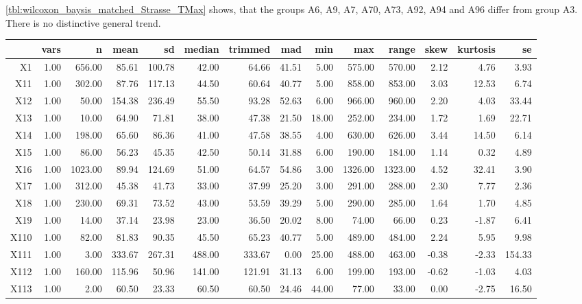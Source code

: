 \cref{tbl:wilcoxon_baysis_matched_Strasse_TMax} shows, that the groups A6, A9, A7, A70, A73, A92, A94 and A96 differ from group A3. There is no distinctive general trend.
\begin{table}[ht!]
	\tiny
	\centering
  \begin{tabular}{rrrrrrrrrrrrrr}
    \hline
   & vars & n & mean & sd & median & trimmed & mad & min & max & range & skew & kurtosis & se \\ 
    \hline
  X1 & 1.00 & 656.00 & 85.61 & 100.78 & 42.00 & 64.66 & 41.51 & 5.00 & 575.00 & 570.00 & 2.12 & 4.76 & 3.93 \\ 
    X11 & 1.00 & 302.00 & 87.76 & 117.13 & 44.50 & 60.64 & 40.77 & 5.00 & 858.00 & 853.00 & 3.03 & 12.53 & 6.74 \\ 
    X12 & 1.00 & 50.00 & 154.38 & 236.49 & 55.50 & 93.28 & 52.63 & 6.00 & 966.00 & 960.00 & 2.20 & 4.03 & 33.44 \\ 
    X13 & 1.00 & 10.00 & 64.90 & 71.81 & 38.00 & 47.38 & 21.50 & 18.00 & 252.00 & 234.00 & 1.72 & 1.69 & 22.71 \\ 
    X14 & 1.00 & 198.00 & 65.60 & 86.36 & 41.00 & 47.58 & 38.55 & 4.00 & 630.00 & 626.00 & 3.44 & 14.50 & 6.14 \\ 
    X15 & 1.00 & 86.00 & 56.23 & 45.35 & 42.50 & 50.14 & 31.88 & 6.00 & 190.00 & 184.00 & 1.14 & 0.32 & 4.89 \\ 
    X16 & 1.00 & 1023.00 & 89.94 & 124.69 & 51.00 & 64.57 & 54.86 & 3.00 & 1326.00 & 1323.00 & 4.52 & 32.41 & 3.90 \\ 
    X17 & 1.00 & 312.00 & 45.38 & 41.73 & 33.00 & 37.99 & 25.20 & 3.00 & 291.00 & 288.00 & 2.30 & 7.77 & 2.36 \\ 
    X18 & 1.00 & 230.00 & 69.31 & 73.52 & 43.00 & 53.59 & 39.29 & 5.00 & 290.00 & 285.00 & 1.64 & 1.70 & 4.85 \\ 
    X19 & 1.00 & 14.00 & 37.14 & 23.98 & 23.00 & 36.50 & 20.02 & 8.00 & 74.00 & 66.00 & 0.23 & -1.87 & 6.41 \\ 
    X110 & 1.00 & 82.00 & 81.83 & 90.35 & 45.50 & 65.23 & 40.77 & 5.00 & 489.00 & 484.00 & 2.24 & 5.95 & 9.98 \\ 
    X111 & 1.00 & 3.00 & 333.67 & 267.31 & 488.00 & 333.67 & 0.00 & 25.00 & 488.00 & 463.00 & -0.38 & -2.33 & 154.33 \\ 
    X112 & 1.00 & 160.00 & 115.96 & 50.96 & 141.00 & 121.91 & 31.13 & 6.00 & 199.00 & 193.00 & -0.62 & -1.03 & 4.03 \\ 
    X113 & 1.00 & 2.00 & 60.50 & 23.33 & 60.50 & 60.50 & 24.46 & 44.00 & 77.00 & 33.00 & 0.00 & -2.75 & 16.50 \\ 

\end{tabular}
\end{table}
